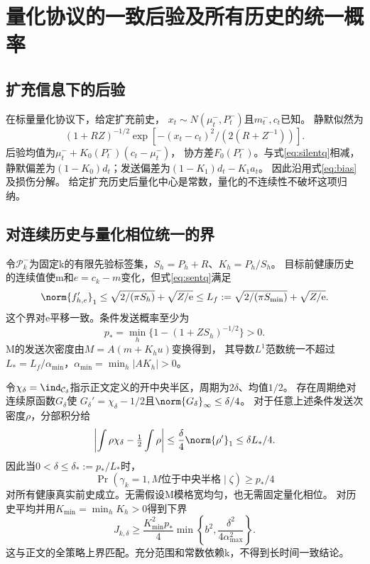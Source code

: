 \section{量化协议的一致后验及所有历史的统一概率}
\label{app:uniform}
\subsection{扩充信息下的后验}
在标量量化协议下，给定扩充前史，
$x_t\sim N(\mu_t^-,P_t^-)$且$m_t^-,c_t$已知。
静默似然为
\[
(1+RZ)^{-1/2}\exp[-(x_t-c_t)^2/(2(R+Z^{-1}))].
\]
后验均值为$\mu_t^-+K_0(P_t^-)(c_t-\mu_t^-)$，
协方差$F_0(P_t^-)$。与式\eqref{eq:silentq}相减，
静默偏差为$(1-K_0)d_t$；发送偏差为$(1-K_1)d_t-K_1a_t$。
因此沿用式\eqref{eq:bias}及损伤分解。
给定扩充历史后量化中心是常数，量化的不连续性不破坏这项归纳。

\subsection{对连续历史与量化相位统一的界}
令$\mathcal P_k^-$为固定k的有限先验标签集，$S_h=P_h+R$、$K_h=P_h/S_h$。
目标前健康历史的连续值使m和$e=c_k-m$变化，但式\eqref{eq:sentq}满足
\[
\norm{f'_{h,e}}_1
\le \sqrt{2/(\pi S_h)}+\sqrt{Z/\mathrm e}
\le L_f:=\sqrt{2/(\pi S_{\min})}+\sqrt{Z/\mathrm e}.
\]
这个界对e平移一致。条件发送概率至少为
\[
p_*=\min_h\{1-(1+ZS_h)^{-1/2}\}>0.
\]
M的发送次密度由$M=A(m+K_hu)$变换得到，
其导数$L^1$范数统一不超过
$L_*=L_f/\alpha_{\min}$，$\alpha_{\min}=\min_h|AK_h|>0$。

令$\chi_\delta=\ind_{\mathcal C_\delta}$指示正文定义的开中央半区，周期为$2\delta$、均值$1/2$。
存在周期绝对连续原函数$G_\delta$使
$G_\delta'=\chi_\delta-1/2$且$\norm{G_\delta}_\infty\le\delta/4$。
对于任意上述条件发送次密度$\rho$，分部积分给
\[
\left|\int\rho\chi_\delta-\tfrac12\int\rho\right|
\le\frac{\delta}{4}\norm{\rho'}_1\le\delta L_*/4.
\]
因此当$0<\delta\le\delta_*:=p_*/L_*$时，
\[
\Pr(\gamma_k=1,M\text{位于中央半格}\mid\zeta)\ge p_*/4
\]
对所有健康真实前史成立。无需假设M模格宽均匀，也无需固定量化相位。
对历史平均并用$K_{\min}=\min_hK_h>0$得到下界
\[
J_{k,\delta}\ge
\frac{K_{\min}^2p_*}{4}
\min\left\{b^2,\frac{\delta^2}{4\alpha_{\max}^2}\right\}.
\]
这与正文的全策略上界匹配。充分范围和常数依赖k，不得到长时间一致结论。
